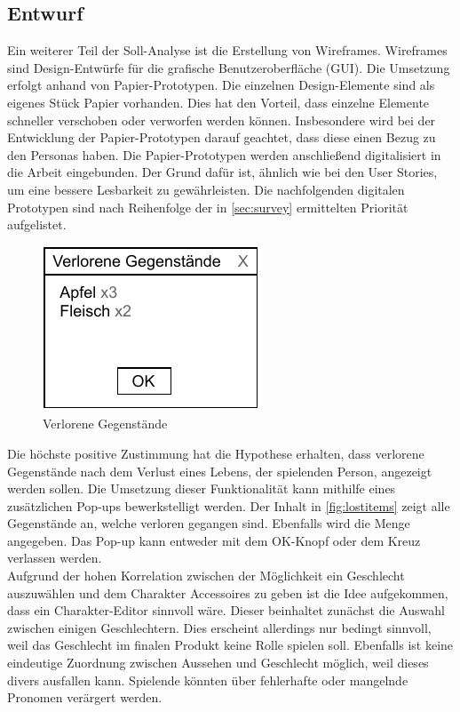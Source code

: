 \subsection{Entwurf}\label{sec:wireframes}
Ein weiterer Teil der Soll-Analyse ist die Erstellung von Wireframes. Wireframes sind Design-Entwürfe für die grafische Benutzeroberfläche (\ac{GUI}). Die Umsetzung erfolgt anhand von Papier-Prototypen\cite{prototyping-paper}. Die einzelnen Design-Elemente sind als eigenes Stück Papier vorhanden. Dies hat den Vorteil, dass einzelne Elemente schneller verschoben oder verworfen werden können. Insbesondere wird bei der Entwicklung der Papier-Prototypen darauf geachtet, dass diese einen Bezug zu den Personas haben. Die Papier-Prototypen werden anschließend digitalisiert in die Arbeit eingebunden. Der Grund dafür ist, ähnlich wie bei den User Stories, um eine bessere Lesbarkeit zu gewährleisten. Die nachfolgenden digitalen Prototypen sind nach Reihenfolge der in \autoref{sec:survey} ermittelten Priorität aufgelistet.\\

\begin{figure}[H]
\centering
\includegraphics[width=0.4\columnwidth]{figures/wireframes/lost-items.pdf}
\caption{\label{fig:lostitems}Verlorene Gegenstände}
\end{figure}

Die höchste positive Zustimmung hat die Hypothese erhalten, dass verlorene Gegenstände nach dem Verlust eines Lebens, der spielenden Person, angezeigt werden sollen. Die Umsetzung dieser Funktionalität kann mithilfe eines zusätzlichen Pop-ups bewerkstelligt werden. Der Inhalt in \autoref{fig:lostitems} zeigt alle Gegenstände an, welche verloren gegangen sind. Ebenfalls wird die Menge angegeben. Das Pop-up kann entweder mit dem OK-Knopf oder dem Kreuz verlassen werden. \\

Aufgrund der hohen Korrelation zwischen der Möglichkeit ein Geschlecht auszuwählen und dem Charakter Accessoires zu geben ist die Idee aufgekommen, dass ein Charakter-Editor sinnvoll wäre. Dieser beinhaltet zunächst die Auswahl zwischen einigen Geschlechtern. Dies erscheint allerdings nur bedingt sinnvoll, weil das Geschlecht im finalen Produkt keine Rolle spielen soll. Ebenfalls ist keine eindeutige Zuordnung zwischen Aussehen und Geschlecht möglich, weil dieses divers ausfallen kann. Spielende könnten über fehlerhafte oder mangelnde Pronomen verärgert werden\cite{rockpapershotgun-gender}. \\

